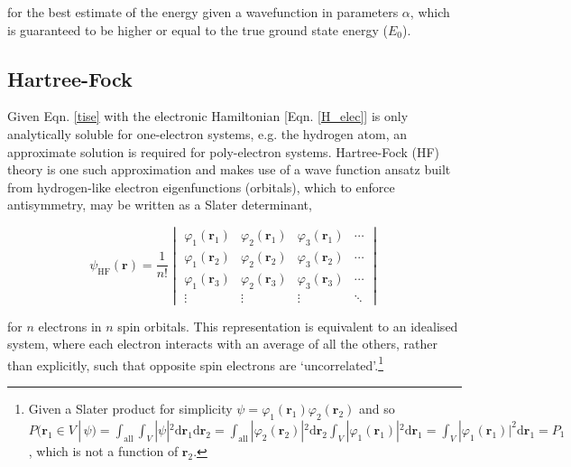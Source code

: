 \documentclass[main.tex]{subfiles}
\begin{document}
 for the best estimate of the energy given a wavefunction in parameters $\alpha$, which is guaranteed to be higher or equal to the true ground state energy ($E_0$).

\subsection{Hartree-Fock}

Given Eqn. \eqref{tise} with the electronic Hamiltonian [Eqn. \eqref{H_elec}] is only analytically soluble for one-electron systems, e.g. the hydrogen atom, an approximate solution is required for poly-electron systems. Hartree-Fock (HF) theory is one such approximation and makes use of a wave function ansatz built from hydrogen-like electron eigenfunctions (orbitals), which to enforce antisymmetry, may be written as a Slater determinant,

\begin{equation}
\psi_\text{HF}(\boldsymbol{r}) = \frac{1}{n!}
\begin{vmatrix}
\varphi_1(\boldsymbol{r}_1) & \varphi_2(\boldsymbol{r}_1) & \varphi_3(\boldsymbol{r}_1) & \cdots \\
\varphi_1(\boldsymbol{r}_2) & \varphi_2(\boldsymbol{r}_2) & \varphi_3(\boldsymbol{r}_2) & \cdots \\
\varphi_1(\boldsymbol{r}_3) & \varphi_2(\boldsymbol{r}_3) & \varphi_3(\boldsymbol{r}_3) & \cdots \\
\vdots & \vdots & \vdots & \ddots
\end{vmatrix}
\label{equation::slater_det}
\end{equation}

for $n$ electrons in $n$ spin orbitals. This representation is equivalent to an idealised system, where each electron interacts with an average of all the others, rather than explicitly, such that opposite spin electrons are `uncorrelated'.\footnote{Given a Slater product for simplicity $\psi = \varphi_1(\boldsymbol{r}_1)\varphi_2(\boldsymbol{r}_2)$ and so $P(\boldsymbol{r}_1 \in V \,|\, \psi) =  \int_\text{all}\int_V |\psi|^2 \text{d}\boldsymbol{r}_1\text{d}\boldsymbol{r}_2 = \int_\text{all}|\varphi_2(\boldsymbol{r}_2)|^2\text{d}\boldsymbol{r}_2\int_V |\varphi_1(\boldsymbol{r}_1)|^2\text{d}\boldsymbol{r}_1 = \int_V |\varphi_1(\boldsymbol{r}_1)|^2\text{d}\boldsymbol{r}_1 = P_1$, which is not a function of $\boldsymbol{r}_2$.}
\end{document}
